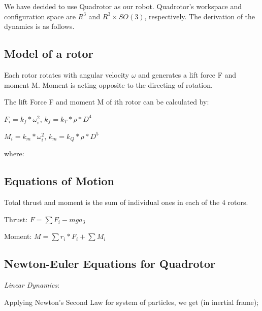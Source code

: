 
We have decided to use Quadrotor as our robot. Quadrotor's workspace and configuration space are \(R^3\) and  \(R^3 \times SO(3)\), respectively.
The derivation of the dynamics is as follows\cite{6289431}.
\subsection{Model of a rotor}

Each rotor rotates with angular velocity $\omega$ and generates a lift force F and moment M. Moment is acting opposite to the directing of rotation.

The lift Force F and moment M of ith rotor can be calculated by:

$F_i = k_f * \omega_i^2$, \hspace{1cm} $k_f = k_T*\rho * D^4$

$M_i = k_m * \omega_i^2$, \hspace{1cm} $k_m = k_Q*\rho * D^5$

where:





\subsection{Equations of Motion}

Total thrust and moment is the sum of individual ones in each of the 4 rotors.

Thrust: $F = \sum F_i - mga_3$


Moment: $M = \sum r_i*F_i + \sum M_i$



\subsection{Newton-Euler Equations for Quadrotor}

\textit{Linear Dynamics}:

Applying Newton's Second Law for system of particles, we get (in inertial frame);

